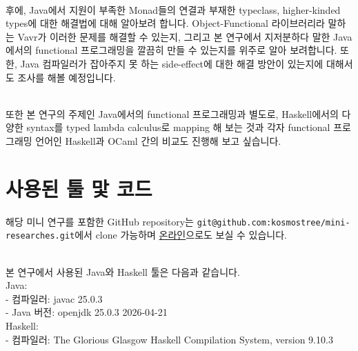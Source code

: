 \documentclass[runningheads]{llncs}
\begin{document}
\noindent
\\
후에,  Java에서 지원이 부족한 Monad들의 연결과 부재한 typeclass, higher-kinded types에 대한 해결법에 대해 알아보려 합니다. 
Object-Functional 라이브러리라 말하는 Vavr\cite{ref_vavr_website}가 이러한 문제를 해결할 수 있는지, 
그리고 본 연구에서 지저분하다 말한 Java에서의 functional 프로그래밍을 깔끔히 만들 수 있는지를 위주로 알아 보려합니다.
또한, Java 컴파일러가 잡아주지 못 하는 side-effect에 대한 해결 방안이 있는지에 대해서도 조사를 해볼 예정입니다.

\noindent
\\
또한 본 연구의 주제인 Java에서의 functional 프로그래밍과 별도로, Haskell에서의 다양한 syntax를 typed lambda calculus로 mapping 해 보는 것과
각자 functional 프로그래밍 언어인 Haskell과 OCaml 간의 비교도 진행해 보고 싶습니다.

\section{사용된 툴 맟 코드}

해당 미니 연구를 포함한 GitHub repository는 \texttt{git@github.com:kosmostree/mini-researches.git}에서 clone 가능하며
 \href{https://github.com/kosmostree/mini-researches}{온라인}으로도 보실 수 있습니다.

\noindent
\\
본 연구에서 사용된 Java와 Haskell 툴은 다음과 같습니다.\\

\noindent Java: \\
- 컴파일러: javac 25.0.3 \\
- Java 버전: openjdk 25.0.3 2026-04-21 \\

\noindent Haskell: \\
- 컴파일러: The Glorious Glasgow Haskell Compilation System, version 9.10.3 \\
\end{document}
